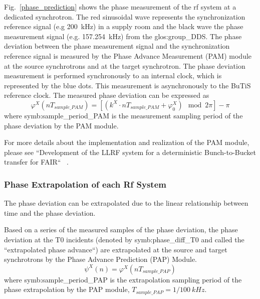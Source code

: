 Fig.~\ref{phase_prediction} shows the phase measurement of the rf system at a dedicated synchrotron. The red sinusoidal wave represents the synchronization reference signal (e.g \SI{200}{kHz}) in a supply room and the black wave the phase measurement signal (e.g. \SI{157.254}{kHz}) from the \gls{glos:group_DDS}. The phase deviation between the phase measurement signal and the synchronization reference signal is measured by the Phase Advance Measurement (\gls{PAM}) module at the source synchrotrons and at the target synchrotron. The phase deviation measurement is performed synchronously to an internal clock, which is represented by the blue dots. This measurement is asynchronously to the BuTiS reference clock. The measured phase deviation can be expressed as
\begin{equation}
\varphi^X(nT_\mathit{sample\_PAM})=[( k^\mathit{X}\cdot nT_\mathit{sample\_PAM}+\varphi^X_0) \mod 2\pi ]-\pi
\end{equation}
where \gls{symb:sample_period_PAM} is the measurement sampling period of the phase deviation by the PAM module.

For more details about the implementation and realization of the PAM module, please see ``Development of the LLRF system for a deterministic Bunch-to-Bucket transfer for FAIR`` ~\cite{ferrand_development_????}. 
\subsubsection{Phase Extrapolation of each Rf System}
The phase deviation can be extrapolated due to the linear relationship between time and the phase deviation. 

Based on a series of the measured samples of the phase deviation, the phase deviation at the T0 incidents (denoted by \gls{symb:phase_diff_T0} and called the ``extrapolated phase advance``) are extrapolated at the source and target synchrotrons by the Phase Advance Prediction (\gls{PAP}) Module.
\begin{equation}
\psi^\mathit{X}(n)=\varphi^X(nT_\mathit{sample\_PAP})
\end{equation}
where \gls{symb:sample_period_PAP} is the extrapolation sampling period of the phase extrapolation by the PAP module, $T_\mathit{sample\_PAP}=1/\SI{100}{kHz}$.


